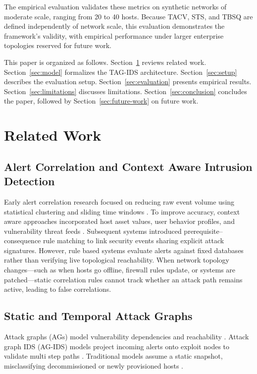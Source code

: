 \documentclass[runningheads]{llncs}
\begin{document}
The empirical evaluation validates these metrics on synthetic networks of moderate scale, ranging from 20 to 40 hosts. Because TACV, STS, and TBSQ are defined independently of network scale, this evaluation demonstrates the framework's validity, with empirical performance under larger enterprise topologies reserved for future work.

This paper is organized as follows. Section~\ref{sec:related-work} reviews related work. Section~\ref{sec:model} formalizes the TAG-IDS architecture. Section~\ref{sec:setup} describes the evaluation setup. Section~\ref{sec:evaluation} presents empirical results. Section~\ref{sec:limitations} discusses limitations. Section~\ref{sec:conclusion} concludes the paper, followed by Section~\ref{sec:future-work} on future work.

\section{Related Work}\label{sec:related-work}

\subsection{Alert Correlation and Context Aware Intrusion Detection}
Early alert correlation research focused on reducing raw event volume using statistical clustering and sliding time windows \cite{10.1145/586110.586144,1366134,s22041494}. To improve accuracy, context aware approaches incorporated host asset values, user behavior profiles, and vulnerability threat feeds \cite{Aleroud2017}. Subsequent systems introduced prerequisite--consequence rule matching to link security events sharing explicit attack signatures. However, rule based systems evaluate alerts against fixed databases rather than verifying live topological reachability. When network topology changes—such as when hosts go offline, firewall rules update, or systems are patched—static correlation rules cannot track whether an attack path remains active, leading to false correlations.

\subsection{Static and Temporal Attack Graphs}\label{sec:TAG}
Attack graphs (AGs) model vulnerability dependencies and reachability \cite{1004377,mulval,6263942}. Attack graph IDS (AG-IDS) models project incoming alerts onto exploit nodes to validate multi step paths \cite{Roschke2010,Angelini2019}. Traditional models assume a static snapshot, misclassifying decommissioned or newly provisioned hosts \cite{ENOCH2019102448}.
\end{document}

